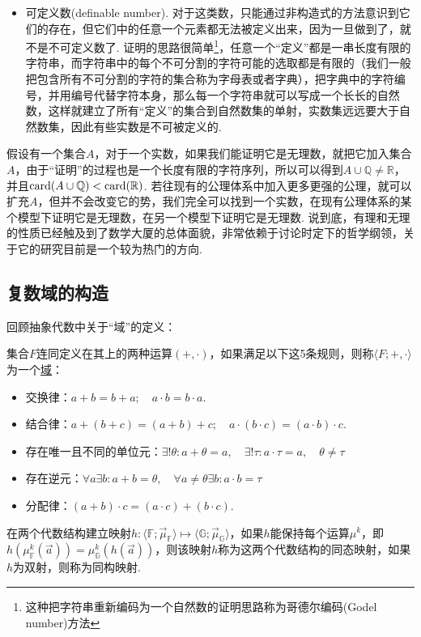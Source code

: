 \begin{itemize}
    \item[(3)]
    可定义数(definable number). 对于这类数，只能通过非构造式的方法意识到它们的存在，但它们中的任意一个元素都无法被定义出来，因为一旦做到了，就不是不可定义数了. 证明的思路很简单\footnote{这种把字符串重新编码为一个自然数的证明思路称为哥德尔编码(Godel number)方法}，任意一个“定义”都是一串长度有限的字符串，而字符串中的每个不可分割的字符可能的选取都是有限的（我们一般把包含所有不可分割的字符的集合称为字母表或者字典），把字典中的字符编号，并用编号代替字符本身，那么每一个字符串就可以写成一个长长的自然数，这样就建立了所有“定义”的集合到自然数集的单射，实数集远远要大于自然数集，因此有些实数是不可被定义的.
\end{itemize}

假设有一个集合\(A\)，对于一个实数，如果我们能证明它是无理数，就把它加入集合\(A\)，由于“证明”的过程也是一个长度有限的字符序列，所以可以得到\(A\cup\mathbb{Q}\neq \mathbb{R}\)，并且\({\rm card}(A\cup\mathbb{Q})<{\rm card}(\mathbb{R})\). 若往现有的公理体系中加入更多更强的公理，就可以扩充\(A\)，但并不会改变它的势，我们完全可以找到一个实数，在现有公理体系的某个模型下证明它是无理数，在另一个模型下证明它是无理数. 说到底，有理和无理的性质已经触及到了数学大厦的总体面貌，非常依赖于讨论时定下的哲学纲领，关于它的研究目前是一个较为热门的方向.

\subsection{复数域的构造}

回顾抽象代数中关于“域”的定义：
\begin{reference}
    集合\(F\)连同定义在其上的两种运算\((+,\cdot)\)，如果满足以下这5条规则，则称\(\langle F; +, \cdot \rangle\)为一个\underline{域}：
    \begin{itemize}
        \item [(1)] 交换律：\(a+b=b+a; \quad a \cdot b = b \cdot a\).
        \item [(2)] 结合律：\(a+(b+c) = (a+b)+c; \quad a \cdot (b \cdot c) = (a \cdot b) \cdot c\).
        \item [(3)] 存在唯一且不同的单位元：\(\exists!\theta: a+\theta=a, \quad \exists!\tau: a\cdot \tau = a, \quad \theta\neq\tau\)
        \item [(4)] 存在逆元：\(\forall a\exists b: a+b=\theta, \quad \forall a\neq \theta \exists b: a\cdot b = \tau\)
        \item [(5)] 分配律：\((a+b)\cdot c = (a \cdot c)+(b \cdot c)\).
    \end{itemize}
    在两个代数结构建立映射\(h: \langle \mathbb{F}; \vec{\mu}_\mathbb{F} \rangle \mapsto \langle \mathbb{G}; \vec{\mu}_\mathbb{G} \rangle\)，如果\(h\)能保持每个运算\(\mu^k\)，即\(h(\mu_\mathbb{F}^k(\vec{a})) = \mu_{\mathbb{G}}^k(h(\vec{a}))\)，则该映射\(h\)称为这两个代数结构的同态映射，如果\(h\)为双射，则称为同构映射.
\end{reference}

